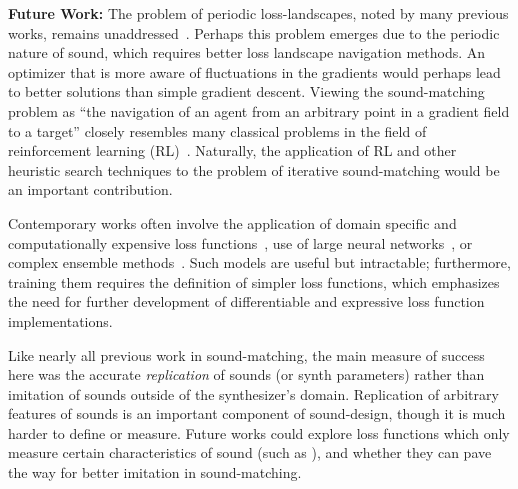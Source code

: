 \label{sec:future}
\textbf{Future Work: } The problem of periodic loss-landscapes, noted by many previous works, remains unaddressed~\cite{turian2020sorry,vahidi2023mesostructures,uzrad2024diffmoog,bruford2024synthesizer}. Perhaps this problem emerges due to the periodic nature of sound, which requires better loss landscape navigation methods. An optimizer that is more aware of fluctuations in the gradients would perhaps lead to better solutions than simple gradient descent. Viewing the sound-matching problem as ``the navigation of an agent from an arbitrary point in a gradient field to a target'' closely resembles many classical problems in the field of reinforcement learning (RL)~\cite{sutton2018reinforcement}. Naturally, the application of RL and other heuristic search techniques to the problem of iterative sound-matching would be an important contribution.

Contemporary works often involve the application of domain specific and computationally expensive loss functions~\cite{han2023perceptual,uzrad2024diffmoog}, use of large neural networks~\cite{hershey2017cnn,cramer2019look}, or complex ensemble methods~\cite{turian2022hear}. Such models are useful but intractable; furthermore, training them requires the definition of simpler loss functions, which emphasizes the need for further development of differentiable and expressive loss function implementations. 

Like nearly all previous work in sound-matching, the main measure of success here was the accurate \textit{replication} of sounds (or synth parameters) rather than imitation of sounds outside of the synthesizer's domain. Replication of arbitrary features of sounds is an important component of sound-design, though it is much harder to define or measure. Future works could explore loss functions which only measure certain characteristics of sound (such as \DTWEnv), and whether they can pave the way for better imitation in sound-matching.
